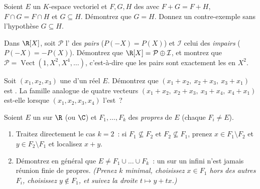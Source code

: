 \begin{exercise}[$\star\star\star$]\label{exo:b1:vspaces:9}
Soient $E$ un $K$-espace vectoriel et $F, G, H$ des  avec
$F + G = F + H$, $F \cap G = F \cap H$ et $G \subseteq H$. Démontrez
que $G = H$. Donnez un contre-exemple sans l'hypothèse
$G \subseteq H$.
\end{exercise}

\begin{exercise}[$\star\star$]\label{exo:b1:vspaces:10}
Dans $\R[X]$, soit $\mathcal P$ l' des  \emph{pairs}
($P(-X) = P(X)$) et $\mathcal I$ celui des  \emph{impairs}
($P(-X) = -P(X)$). Démontrez que $\R[X] = \mathcal P \oplus \mathcal
I$, et montrez que $\mathcal P =
\operatorname{Vect}(1, X^2, X^4, \dots)$, c'est-à-dire que les
 pairs sont exactement les  en $X^2$.
\end{exercise}

\begin{exercise}[$\star\star$]\label{exo:b1:vspaces:11}
Soit $(x_1, x_2, x_3)$ une  d'un  réel $E$.
Démontrez que $(x_1 + x_2,\ x_2 + x_3,\ x_3 + x_1)$ est . La
famille analogue de quatre vecteurs $(x_1 + x_2,\ x_2 + x_3,\ x_3 +
x_4,\ x_4 + x_1)$ est-elle  lorsque $(x_1, x_2, x_3, x_4)$ l'est~?
\end{exercise}

\begin{exercise}[$\star\star\star$]\label{exo:b1:vspaces:12}
Soient $E$ un  sur $\R$ (ou $\C$) et $F_1, \dots,
F_k$ des  \emph{propres} de $E$ (chaque $F_i \neq E$).
\begin{enumerate}
  \item Traitez directement le cas $k = 2$~: si $F_1 \not\subseteq
        F_2$ et $F_2 \not\subseteq F_1$, prenez $x \in F_1
        \setminus F_2$ et $y \in F_2 \setminus F_1$ et localisez $x
        + y$.
  \item Démontrez en général que $E \neq F_1 \cup \dots \cup F_k$~: un
         sur un  infini n'est jamais réunion
        finie de  propres. \emph{(Prenez $k$ minimal,
        choisissez $x \in F_1$ hors des autres $F_i$, choisissez $y
        \notin F_1$, et suivez la droite $t \mapsto y + tx$.)}
\end{enumerate}
\end{exercise}

